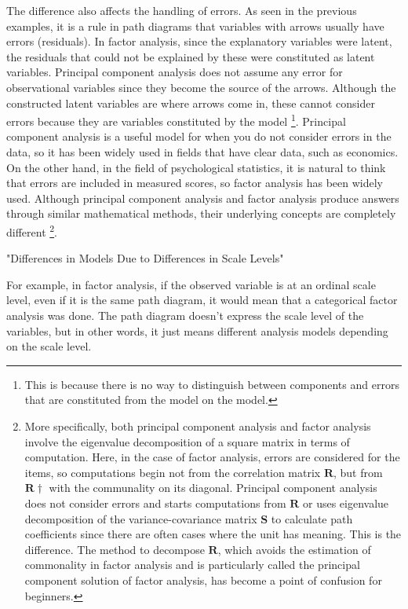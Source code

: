 \documentclass{ltjsbook}
\begin{document}
The difference also affects the handling of errors. As seen in the previous examples, it is a rule in path diagrams that variables with arrows usually have errors (residuals). In factor analysis, since the explanatory variables were latent, the residuals that could not be explained by these were constituted as latent variables. Principal component analysis does not assume any error for observational variables since they become the source of the arrows. Although the constructed latent variables are where arrows come in, these cannot consider errors because they are variables constituted by the model \footnote{This is because there is no way to distinguish between components and errors that are constituted from the model on the model.}. Principal component analysis is a useful model for when you do not consider errors in the data, so it has been widely used in fields that have clear data, such as economics. On the other hand, in the field of psychological statistics, it is natural to think that errors are included in measured scores, so factor analysis has been widely used. Although principal component analysis and factor analysis produce answers through similar mathematical methods, their underlying concepts are completely different \footnote{More specifically, both principal component analysis and factor analysis involve the eigenvalue decomposition of a square matrix in terms of computation. Here, in the case of factor analysis, errors are considered for the items, so computations begin not from the correlation matrix $\bm{R}$, but from $\bm{R}\dagger$ with the communality on its diagonal. Principal component analysis does not consider errors and starts computations from $\bm{R}$ or uses eigenvalue decomposition of the variance-covariance matrix $\bm{S}$ to calculate path coefficients since there are often cases where the unit has meaning. This is the difference. The method to decompose $\bm{R}$, which avoids the estimation of commonality in factor analysis and is particularly called the principal component solution of factor analysis, has become a point of confusion for beginners.}.

"Differences in Models Due to Differences in Scale Levels"

For example, in factor analysis, if the observed variable is at an ordinal scale level, even if it is the same path diagram, it would mean that a categorical factor analysis was done. The path diagram doesn't express the scale level of the variables, but in other words, it just means different analysis models depending on the scale level.
\end{document}
